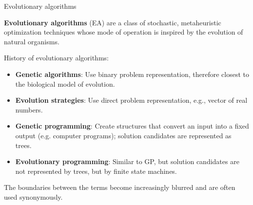 
\subtitle{Evolutionary Algorithms}




\maketitle



\begin{frame}[containsverbatim]{Evolutionary algorithms}

\textbf{Evolutionary algorithms} (EA) are a class of stochastic, metaheuristic optimization techniques whose mode of operation is inspired by the evolution of natural organisms.

\vspace{0.5cm}

History of evolutionary algorithms:

\begin{itemize}
\item \textbf{Genetic algorithms}: Use binary problem representation, therefore closest to the biological model of evolution.
\item \textbf{Evolution strategies}: Use direct problem representation, e.g., vector of real numbers.
\item \textbf{Genetic programming}: Create structures that convert an input into a fixed output (e.g. computer programs); solution candidates are represented as trees.
\item \textbf{Evolutionary programming}: Similar to GP, but solution candidates are not represented by trees, but by finite state machines.
\end{itemize}

The boundaries between the terms become increasingly blurred and are often used synonymously.
\end{frame}

